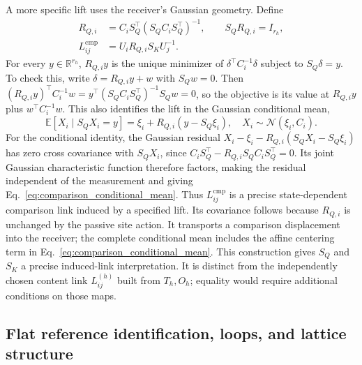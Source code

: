 \documentclass[twoside,11pt]{article}
\begin{document}
A more specific lift uses the receiver's Gaussian geometry. Define
\begin{align}
R_{Q,i}&=C_iS_Q^\top(S_QC_iS_Q^\top)^{-1},\qquad S_QR_{Q,i}=I_{r_h},\\
L_{ij}^{\mathrm{cmp}}
&=U_iR_{Q,i}S_KU_j^{-1}.
\label{eq:comparison_gaussian_lift}
\end{align}
For every $y\in\mathbb R^{r_h}$, $R_{Q,i}y$ is the unique minimizer of $\delta^\top C_i^{-1}\delta$ subject to $S_Q\delta=y$. To check this, write $\delta=R_{Q,i}y+w$ with $S_Qw=0$. Then $(R_{Q,i}y)^\top C_i^{-1}w=y^\top(S_QC_iS_Q^\top)^{-1}S_Qw=0$, so the objective is its value at $R_{Q,i}y$ plus $w^\top C_i^{-1}w$. This also identifies the lift in the Gaussian conditional mean,
\begin{equation}
\mathbb E[X_i\mid S_QX_i=y]
=\xi_i+R_{Q,i}(y-S_Q\xi_i),
\quad X_i\sim\mathcal N(\xi_i,C_i).
\label{eq:comparison_conditional_mean}
\end{equation}
For the conditional identity, the Gaussian residual $X_i-\xi_i-R_{Q,i}(S_QX_i-S_Q\xi_i)$ has zero cross covariance with $S_QX_i$, since $C_iS_Q^\top-R_{Q,i}S_QC_iS_Q^\top=0$. Its joint Gaussian characteristic function therefore factors, making the residual independent of the measurement and giving Eq.~\eqref{eq:comparison_conditional_mean}. Thus $L_{ij}^{\mathrm{cmp}}$ is a precise state-dependent comparison link induced by a specified lift. Its covariance follows because $R_{Q,i}$ is unchanged by the passive site action. It transports a comparison displacement into the receiver; the complete conditional mean includes the affine centering term in Eq.~\eqref{eq:comparison_conditional_mean}. This construction gives $S_Q$ and $S_K$ a precise induced-link interpretation. It is distinct from the independently chosen content link $L_{ij}^{(h)}$ built from $T_h,O_h$; equality would require additional conditions on those maps.

\subsection{Flat reference identification, loops, and lattice structure}
\label{sec:flat_identification}
\end{document}
